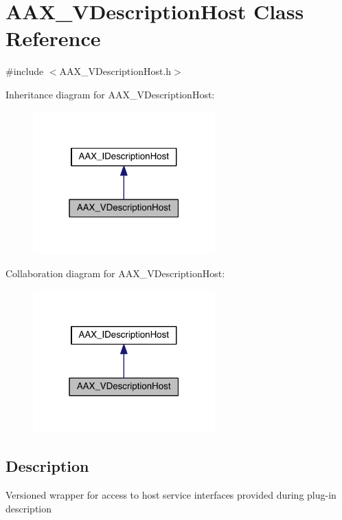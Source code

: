 \hypertarget{a00133}{}\section{A\+A\+X\+\_\+\+V\+Description\+Host Class Reference}
\label{a00133}


{\ttfamily \#include $<$A\+A\+X\+\_\+\+V\+Description\+Host.\+h$>$}



Inheritance diagram for A\+A\+X\+\_\+\+V\+Description\+Host\+:
\nopagebreak
\begin{figure}[H]
\begin{center}
\leavevmode
\includegraphics[width=199pt]{a00695}
\end{center}
\end{figure}


Collaboration diagram for A\+A\+X\+\_\+\+V\+Description\+Host\+:
\nopagebreak
\begin{figure}[H]
\begin{center}
\leavevmode
\includegraphics[width=199pt]{a00696}
\end{center}
\end{figure}


\subsection{Description}
Versioned wrapper for access to host service interfaces provided during plug-\/in description

